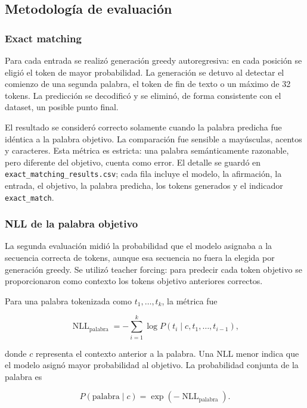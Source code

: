 \documentclass[11pt,a4paper]{article}
\newcommand{\code}[1]{\texttt{#1}}
\begin{document}
\subsection{Metodología de evaluación}

\subsubsection{Exact matching}

Para cada entrada se realizó generación greedy autoregresiva: en cada posición
se eligió el token de mayor probabilidad. La generación se detuvo al detectar
el comienzo de una segunda palabra, el token de fin de texto o un máximo de 32
tokens. La predicción se decodificó y se eliminó, de forma consistente con el
dataset, un posible punto final.

El resultado se consideró correcto solamente cuando la palabra predicha fue
idéntica a la palabra objetivo. La comparación fue sensible a mayúsculas,
acentos y caracteres. Esta métrica es estricta: una palabra semánticamente
razonable, pero diferente del objetivo, cuenta como error. El detalle se guardó
en \code{exact\_matching\_results.csv}; cada fila incluye el modelo, la
afirmación, la entrada, el objetivo, la palabra predicha, los tokens generados y
el indicador \code{exact\_match}.

\subsubsection{NLL de la palabra objetivo}

La segunda evaluación midió la probabilidad que el modelo asignaba a la
secuencia correcta de tokens, aunque esa secuencia no fuera la elegida por
generación greedy. Se utilizó teacher forcing: para predecir cada token objetivo
se proporcionaron como contexto los tokens objetivo anteriores correctos.

Para una palabra tokenizada como $t_1,\ldots,t_k$, la métrica fue

\begin{equation}
    \operatorname{NLL}_{\text{palabra}}
    = -\sum_{i=1}^{k}
    \log P\!\left(t_i \mid c,t_1,\ldots,t_{i-1}\right),
    \label{eq:nll}
\end{equation}

donde $c$ representa el contexto anterior a la palabra. Una NLL menor indica
que el modelo asignó mayor probabilidad al objetivo. La probabilidad conjunta
de la palabra es

\begin{equation}
    P(\text{palabra}\mid c)
    = \exp\!\left(-\operatorname{NLL}_{\text{palabra}}\right).
\end{equation}
\end{document}
